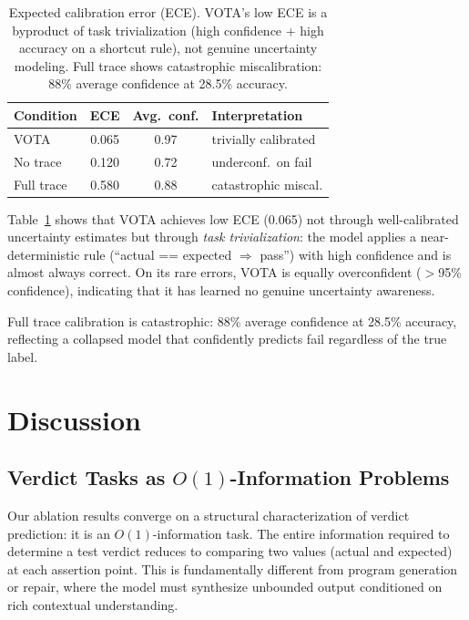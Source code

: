 \documentclass[11pt,a4paper]{article}
\begin{document}
\begin{table}[t]
\centering
\small
\begin{tabular}{lccl}
\toprule
\textbf{Condition} & \textbf{ECE} & \textbf{Avg.\ conf.} & \textbf{Interpretation} \\
\midrule
VOTA & 0.065 & 0.97 & trivially calibrated \\
No trace & 0.120 & 0.72 & underconf.\ on fail \\
Full trace & 0.580 & 0.88 & catastrophic miscal. \\
\bottomrule
\end{tabular}
\caption{Expected calibration error (ECE). VOTA's low ECE is a byproduct of task trivialization (high confidence + high accuracy on a shortcut rule), not genuine uncertainty modeling. Full trace shows catastrophic miscalibration: 88\% average confidence at 28.5\% accuracy.}
\label{tab:calibration}
\end{table}

Table~\ref{tab:calibration} shows that VOTA achieves low ECE (0.065) not through well-calibrated uncertainty estimates but through \emph{task trivialization}: the model applies a near-deterministic rule (``actual == expected $\Rightarrow$ pass'') with high confidence and is almost always correct. On its rare errors, VOTA is equally overconfident ($>$95\% confidence), indicating that it has learned no genuine uncertainty awareness.

Full trace calibration is catastrophic: 88\% average confidence at 28.5\% accuracy, reflecting a collapsed model that confidently predicts fail regardless of the true label.

\section{Discussion}
\label{sec:discussion}

\subsection{Verdict Tasks as $O(1)$-Information Problems}

Our ablation results converge on a structural characterization of verdict prediction: it is an $O(1)$-information task. The entire information required to determine a test verdict reduces to comparing two values (actual and expected) at each assertion point. This is fundamentally different from program generation or repair, where the model must synthesize unbounded output conditioned on rich contextual understanding.
\end{document}
